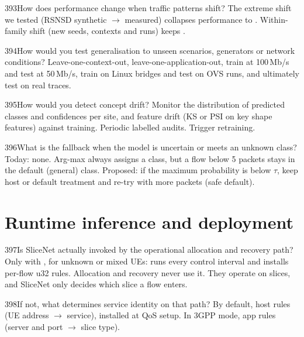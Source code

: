 \begin{qa}{393}{How does performance change when traffic patterns shift?}
The extreme shift we tested (RSNSD synthetic $\rightarrow$ measured) collapses performance to \NTrZero{}.
Within-family shift (new seeds, contexts and runs) keeps \NSnRfFone.
\end{qa}

\begin{qa}{394}{How would you test generalisation to unseen scenarios, generators or network conditions?}
Leave-one-context-out, leave-one-application-out, train at 100\,Mb/s and test at 50\,Mb/s, train on Linux bridges and
test on OVS runs, and ultimately test on real traces.
\end{qa}

\begin{qa}{395}{How would you detect concept drift?}
Monitor the distribution of predicted classes and confidences per site, and feature drift (KS or PSI on key shape
features) against training. Periodic labelled audits. Trigger retraining.
\end{qa}

\begin{qa}{396}{What is the fallback when the model is uncertain or meets an unknown class?}
Today: none. Arg-max always assigns a class, but a flow below 5 packets stays in the default (general) class.
Proposed: if the maximum probability is below $\tau$, keep host or default treatment and re-try with more packets
(safe default).
\end{qa}

\section{Runtime inference and deployment}

\begin{qa}{397}{Is SliceNet actually invoked by the operational allocation and recovery path?}
Only with , for unknown or mixed UEs:  runs every
control interval and installs per-flow u32 rules. Allocation and recovery never use it. They operate on slices, and
SliceNet only decides which slice a flow enters.
\end{qa}

\begin{qa}{398}{If not, what determines service identity on that path?}
By default, host rules (UE address $\rightarrow$ service), installed at QoS setup. In 3GPP mode, app rules (server and
port $\rightarrow$ slice type).
\end{qa}

